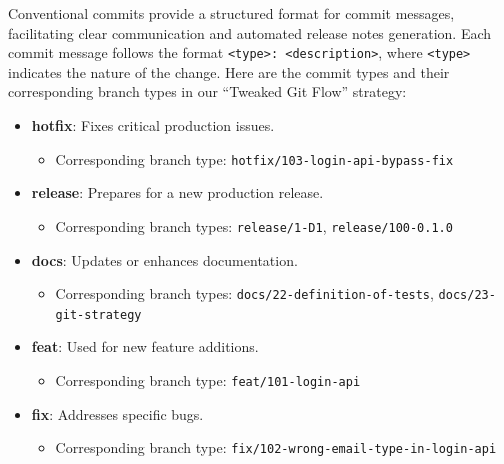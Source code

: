 Conventional commits provide a structured format for commit messages, facilitating clear communication and automated release notes generation. Each commit message follows the format \texttt{<type>: <description>}, where \texttt{<type>} indicates the nature of the change. Here are the commit types and their corresponding branch types in our ``Tweaked Git Flow'' strategy:

\begin{itemize}
	\item \textbf{hotfix}: Fixes critical production issues.
	\begin{itemize}
		\item Corresponding branch type: \texttt{hotfix/103-login-api-bypass-fix}
	\end{itemize}
	\item \textbf{release}: Prepares for a new production release.
	\begin{itemize}
		\item Corresponding branch types: \texttt{release/1-D1}, \texttt{release/100-0.1.0}
	\end{itemize}
	\item \textbf{docs}: Updates or enhances documentation.
	\begin{itemize}
		\item Corresponding branch types: \texttt{docs/22-definition-of-tests}, \texttt{docs/23-git-strategy}
	\end{itemize}
	\item \textbf{feat}: Used for new feature additions.
	\begin{itemize}
		\item Corresponding branch type: \texttt{feat/101-login-api}
	\end{itemize}
	\item \textbf{fix}: Addresses specific bugs.
	\begin{itemize}
		\item Corresponding branch type: \texttt{fix/102-wrong-email-type-in-login-api}
	\end{itemize}
\end{itemize}
